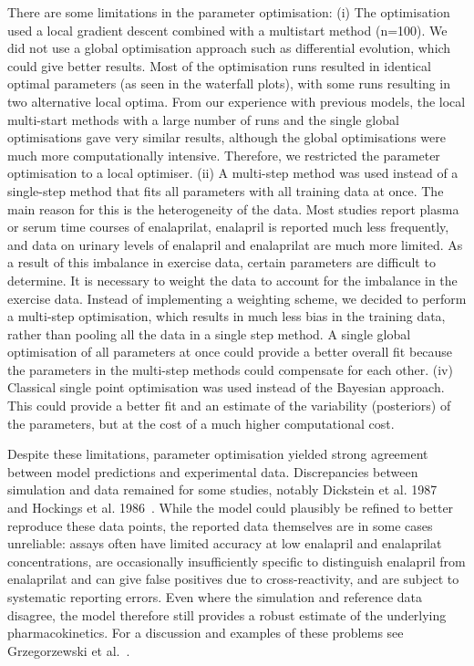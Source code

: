 There are some limitations in the parameter optimisation: (i) The optimisation used a local gradient descent combined with a multistart method (n=100). We did not use a global optimisation approach such as differential evolution, which could give better results. Most of the optimisation runs resulted in identical optimal parameters (as seen in the waterfall plots), with some runs resulting in two alternative local optima. From our experience with previous models, the local multi-start methods with a large number of runs and the single global optimisations gave very similar results, although the global optimisations were much more computationally intensive. Therefore, we restricted the parameter optimisation to a local optimiser. (ii) A multi-step method was used instead of a single-step method that fits all parameters with all training data at once. The main reason for this is the heterogeneity of the data. Most studies report plasma or serum time courses of enalaprilat, enalapril is reported much less frequently, and data on urinary levels of enalapril and enalaprilat are much more limited. As a result of this imbalance in exercise data, certain parameters are difficult to determine. It is necessary to weight the data to account for the imbalance in the exercise data. Instead of implementing a weighting scheme, we decided to perform a multi-step optimisation, which results in much less bias in the training data, rather than pooling all the data in a single step method. A single global optimisation of all parameters at once could provide a better overall fit because the parameters in the multi-step methods could compensate for each other. (iv) Classical single point optimisation was used instead of the Bayesian approach. This could provide a better fit and an estimate of the variability (posteriors) of the parameters, but at the cost of a much higher computational cost. 

Despite these limitations, parameter optimisation yielded strong agreement between model predictions and experimental data. Discrepancies between simulation and data remained for some studies, notably Dickstein et al. 1987~\cite{Dickstein1987} and Hockings et al. 1986~\cite{Hockings1986}. While the model could plausibly be refined to better reproduce these data points, the reported data themselves are in some cases unreliable: assays often have limited accuracy at low enalapril and enalaprilat concentrations, are occasionally insufficiently specific to distinguish enalapril from enalaprilat and can give false positives due to cross-reactivity, and are subject to systematic reporting errors. Even where the simulation and reference data disagree, the model therefore still provides a robust estimate of the underlying pharmacokinetics. For a discussion and examples of these problems see Grzegorzewski et al.~\cite{Grzegorzewski2021a}.


